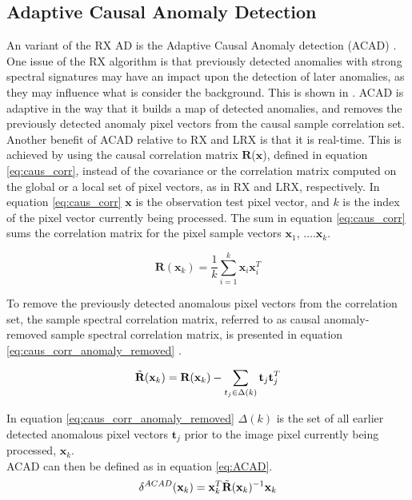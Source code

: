 \subsection{Adaptive Causal Anomaly Detection}
\label{sec:ACAD_theory}
An variant of the RX AD is the Adaptive Causal Anomaly detection (ACAD) \cite{chang2006characterization}. One issue of the RX algorithm is that previously detected anomalies with strong spectral signatures may have an impact upon the detection of later anomalies, as they may influence what is consider the background. This is shown in \cite{chang2006characterization}. ACAD is adaptive in the way that it builds a map of detected anomalies, and removes the previously detected anomaly pixel vectors from the causal sample correlation set. \\
Another benefit of ACAD relative to RX and LRX is that it is real-time. This is achieved by using the causal correlation matrix $\textbf{R}$($\textbf{x}$), defined in equation \ref{eq:caus_corr}, instead of the covariance or the correlation matrix computed on the global or a local set of pixel vectors, as in RX and LRX, respectively. In equation \ref{eq:caus_corr} $\textbf{x}$ is the observation test pixel vector, and $k$ is the index of the pixel vector currently being processed. The sum in equation \ref{eq:caus_corr} sums the correlation matrix for the pixel sample vectors {$\textbf{x}_1$, ....$\textbf{x}_k$}.  

\begin{equation}
    \textbf{R}(\textbf{x}_k)=\frac{1}{k}\sum_{i=1}^k\textbf{x}_i\textbf{x}_i^T
    \label{eq:caus_corr}
\end{equation}

To remove the previously detected anomalous pixel vectors from the correlation set, the sample spectral correlation matrix, referred to as causal anomaly-removed sample spectral correlation matrix, is presented in equation \ref{eq:caus_corr_anomaly_removed} \cite{chang2006characterization}.

\begin{equation}
    \Tilde{\textbf{R}}(\textbf{x}_k)= \textbf{R}(\textbf{x}_k) - \sum_{t_j\in\Delta(k)}\textbf{t}_j\textbf{t}_j^T
    \label{eq:caus_corr_anomaly_removed}
\end{equation}

In equation \ref{eq:caus_corr_anomaly_removed} $\Delta(k)$ is the set of all earlier detected anomalous pixel vectors $\textbf{t}_j$ prior to the image pixel currently being processed, $\textbf{x}_k$.
\\
ACAD can then be defined as in equation \ref{eq:ACAD}.
\begin{equation}
    \delta^{ACAD}(\textbf{x}_k)= \textbf{x}_k^T\Tilde{\textbf{R}}(\textbf{x}_k)^{-1}\textbf{x}_k
    \label{eq:ACAD}
\end{equation}


